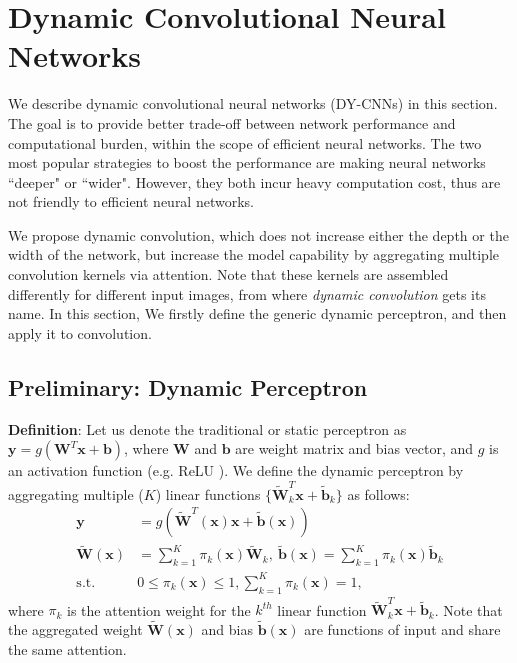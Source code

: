 \documentclass[10pt,twocolumn,letterpaper]{article}
\begin{document}
\section{Dynamic Convolutional Neural Networks}
We describe dynamic convolutional neural networks (DY-CNNs) in this section. The goal is to provide better trade-off between network performance and computational burden, within the scope of efficient neural networks. The two most popular strategies to boost the performance are making neural networks ``deeper" or ``wider". However, they both incur heavy computation cost, thus are not friendly to efficient neural networks. 

We propose dynamic convolution, which does not increase either the depth or the width of the network, but increase the model capability by aggregating multiple convolution kernels via attention. Note that these kernels are assembled differently for different input images, from where \textit{dynamic convolution} gets its name. In this section, We firstly define the generic dynamic perceptron, and then apply it to convolution.

\subsection{Preliminary: Dynamic Perceptron}
\noindent \textbf{Definition}: Let us denote the traditional or static perceptron as $\bm{y}=g(\bm{W}^T\bm{x}+\bm{b})$, where $\bm{W}$ and $\bm{b}$ are weight matrix and bias vector, and $g$ is an activation function (e.g. ReLU \cite{NairH10Relu,JarrettKRL09Relu}). We define the dynamic perceptron by aggregating multiple ($K$) linear functions $\{\bm{\tilde{W}}^T_k\bm{x}+\bm{\tilde{b}}_k\}$ as follows:
\begin{align}
\bm{y} &= g(\bm{\tilde{W}}^T(\bm{x})\bm{x}+\bm{\tilde{b}}(\bm{x})) \nonumber \\
\bm{\tilde{W}}(\bm{x})&=\sum_{k=1}^K\pi_k(\bm{x})\bm{\tilde{W}}_k, \:
\bm{\tilde{b}}(\bm{x})=\sum_{k=1}^K\pi_k(\bm{x})\bm{\tilde{b}}_k \nonumber \\
\text{s.t.} \;\;\; &0 \leq \pi_k(\bm{x}) \leq 1, 
\sum_{k=1}^K \pi_k(\bm{x}) = 1,
\label{eq:dynamic-perceptron}
\end{align}
where $\pi_k$ is the attention weight for the $k^{th}$ linear function $\bm{\tilde{W}}^T_k\bm{x}+\bm{\tilde{b}}_k$. Note that the aggregated weight $\bm{\tilde{W}}(\bm{x})$ and bias
$\bm{\tilde{b}}(\bm{x})$ are functions of input and share the same attention.
\end{document}
